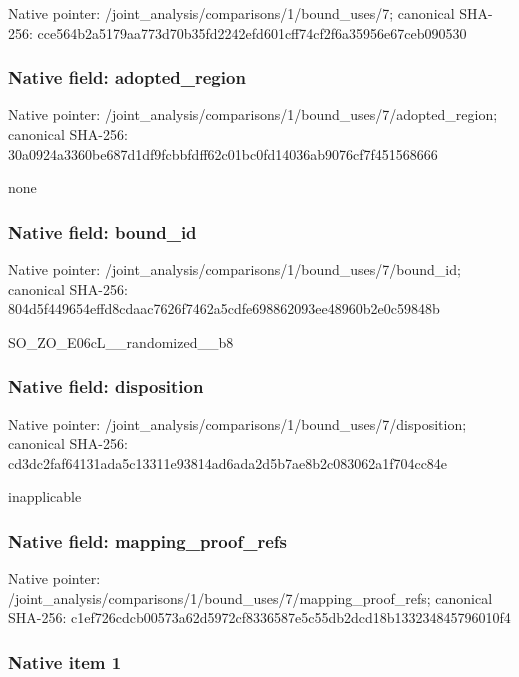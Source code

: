 \documentclass[10pt,a4paper]{article}
\begin{document}
Native pointer: /joint\_analysis/comparis\allowbreak{}ons/1/bound\_uses/7; canonical SHA-256: cce564b2a5179aa773d70b35\allowbreak{}fd2242efd601cff74cf2f6a3\allowbreak{}5956e67ceb090530



\subsubsection{Native field: adopted\_region}


Native pointer: /joint\_analysis/comparis\allowbreak{}ons/1/bound\_uses/7/adopt\allowbreak{}ed\_region; canonical SHA-256: 30a0924a3360be687d1df9fc\allowbreak{}bbfdff62c01bc0fd14036ab9\allowbreak{}076cf7f451568666


none


\subsubsection{Native field: bound\_id}


Native pointer: /joint\_analysis/comparis\allowbreak{}ons/1/bound\_uses/7/bound\allowbreak{}\_id; canonical SHA-256: 804d5f449654effd8cdaac76\allowbreak{}26f7462a5cdfe698862093ee\allowbreak{}48960b2e0c59848b


SO\_ZO\_E06cL\_\_randomized\_\_b8


\subsubsection{Native field: disposition}


Native pointer: /joint\_analysis/comparis\allowbreak{}ons/1/bound\_uses/7/dispo\allowbreak{}sition; canonical SHA-256: cd3dc2faf64131ada5c13311\allowbreak{}e93814ad6ada2d5b7ae8b2c0\allowbreak{}83062a1f704cc84e


inapplicable


\subsubsection{Native field: mapping\_proof\_refs}


Native pointer: /joint\_analysis/comparis\allowbreak{}ons/1/bound\_uses/7/mappi\allowbreak{}ng\_proof\_refs; canonical SHA-256: c1ef726cdcb00573a62d5972\allowbreak{}cf8336587e5c55db2dcd18b1\allowbreak{}33234845796010f4



\subsubsection{Native item 1}
\end{document}
